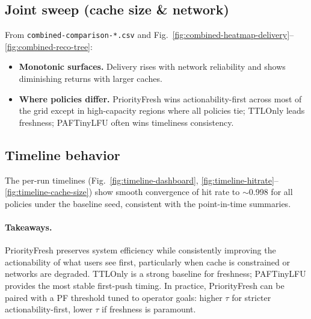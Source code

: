 \documentclass[11pt,twocolumn]{article}
\begin{document}
\subsection{Joint sweep (cache size \& network)}
From \texttt{combined-comparison-*.csv} and Fig.~\ref{fig:combined-heatmap-delivery}--\ref{fig:combined-reco-tree}:
\begin{itemize}
    \item \textbf{Monotonic surfaces.} Delivery rises with network reliability and shows diminishing returns with larger caches.
    \item \textbf{Where policies differ.} PriorityFresh wins actionability-first across most of the grid except in high-capacity regions where all policies tie; TTLOnly leads freshness; PAFTinyLFU often wins timeliness consistency.
\end{itemize}

\subsection{Timeline behavior}
The per-run timelines (Fig.~\ref{fig:timeline-dashboard}, \ref{fig:timeline-hitrate}--\ref{fig:timeline-cache-size}) show smooth convergence of hit rate to $\sim$0.998 for all policies under the baseline seed, consistent with the point-in-time summaries.

\paragraph{Takeaways.}
PriorityFresh preserves system efficiency while consistently improving the actionability of what users see first, particularly when cache is constrained or networks are degraded. TTLOnly is a strong baseline for freshness; PAFTinyLFU provides the most stable first-push timing. In practice, PriorityFresh can be paired with a PF threshold tuned to operator goals: higher $\tau$ for stricter actionability-first, lower $\tau$ if freshness is paramount.
\end{document}
